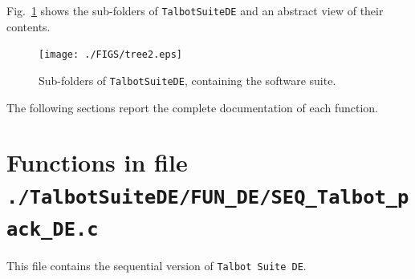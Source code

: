 \documentclass[a4paper,10pt]{report}%
\begin{document}
\newpage
\noindent Fig.~\ref{TREE2} shows the sub-folders of {\tt TalbotSuiteDE} and an abstract view of their
contents.
\begin{figure}[htb]
\centering
\texttt{[image: ./FIGS/tree2.eps]}
\caption{Sub-folders of {\tt TalbotSuiteDE}, containing the software suite.}
\label{TREE2}
\end{figure}

\noindent The following sections report the complete documentation of each function.

\newpage
\section{Functions in file {\large\tt ./TalbotSuiteDE/FUN\_DE/SEQ\_Talbot\_pack\_DE.c}}
This file contains the sequential version of {\tt Talbot Suite DE}.
\end{document}
